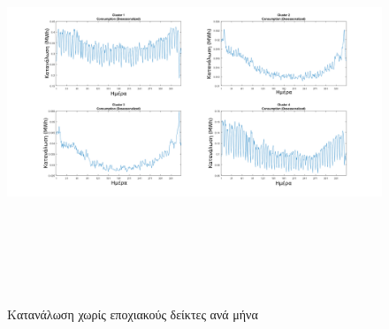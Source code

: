 \begin{figure}[ht!]
\centering
\includegraphics[width=180mm, height=120mm]{../../plots/Trend_estimation/Deseasonalized_month_ALL.png}
\caption{Κατανάλωση χωρίς εποχιακούς δείκτες ανά μήνα}
\label{fig:deseason month}
\end{figure}

